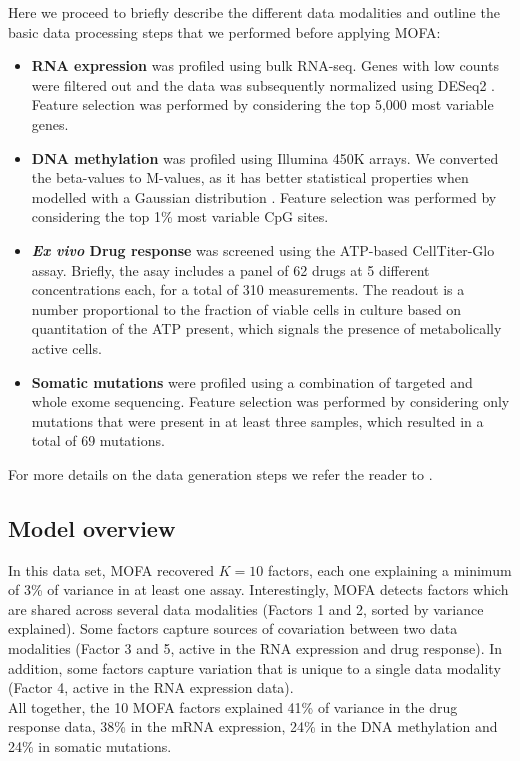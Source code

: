 Here we proceed to briefly describe the different data modalities and outline the basic data processing steps that we performed before applying MOFA:
\begin{itemize}
	\item \textbf{RNA expression} was profiled using bulk RNA-seq. Genes with low counts were filtered out and the data was subsequently normalized using DESeq2 \cite{Love2014}. Feature selection was performed by considering the top 5,000 most variable genes.
	\item \textbf{DNA methylation} was profiled using Illumina 450K arrays. We converted the beta-values to M-values, as it has better statistical properties when modelled with a Gaussian distribution \cite{Du2010}. Feature selection was performed by considering the top 1\% most variable CpG sites. 
	\item \textbf{\textit{Ex vivo} Drug response} was screened using the ATP-based CellTiter-Glo assay. Briefly, the asay includes a panel of 62 drugs at 5 different concentrations each, for a total of 310 measurements. The readout is a number proportional to the fraction of viable cells in culture based on quantitation of the ATP present, which signals the presence of metabolically active cells.

	\item \textbf{Somatic mutations} were profiled using a combination of targeted and whole exome sequencing. Feature selection was performed by considering only mutations that were present in at least three samples, which resulted in a total of 69 mutations.
\end{itemize}

For more details on the data generation steps we refer the reader to \cite{Dietrich2018}.

\subsection{Model overview}

In this data set, MOFA recovered $K=10$ factors, each one explaining a minimum of 3\% of variance in at least one assay. Interestingly, MOFA detects factors which are shared across several data modalities (Factors 1 and 2, sorted by variance explained). Some factors capture sources of covariation between two data modalities (Factor 3 and 5, active in the RNA expression and drug response). In addition, some factors capture variation that is unique to a single data modality (Factor 4, active in the RNA expression data).\\
All together, the 10 MOFA factors explained 41\% of variance in the drug response data, 38\% in the mRNA expression, 24\% in the DNA methylation and 24\% in somatic mutations.

